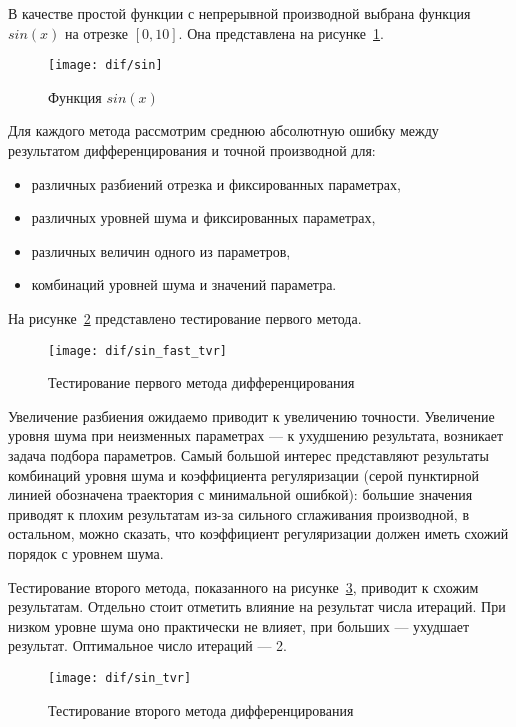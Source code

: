 В качестве простой функции с непрерывной производной выбрана функция $sin(x)$ на отрезке $[0, 10]$. Она представлена на рисунке~\ref{fig:dif:sin}.

\begin{figure}
\texttt{[image: dif/sin]}
\caption{Функция $sin(x)$}
\label{fig:dif:sin}
\end{figure}

Для каждого метода рассмотрим среднюю абсолютную ошибку между результатом дифференцирования и точной производной для:
\begin{itemize}
\item различных разбиений отрезка и фиксированных параметрах,
\item различных уровней шума и фиксированных параметрах,
\item различных величин одного из параметров,
\item комбинаций уровней шума и значений параметра.
\end{itemize}

На рисунке~\ref{fig:dif:sin_fast_tvr} представлено тестирование первого метода.

\begin{figure}
\texttt{[image: dif/sin\_fast\_tvr]}
\caption{Тестирование первого метода дифференцирования}
\label{fig:dif:sin_fast_tvr}
\end{figure}

Увеличение разбиения ожидаемо приводит к увеличению точности. Увеличение уровня шума при неизменных параметрах --- к ухудшению результата, возникает задача подбора параметров. Самый большой интерес представляют результаты комбинаций уровня шума и коэффициента регуляризации (серой пунктирной линией обозначена траектория с минимальной ошибкой): большие значения приводят к плохим результатам из-за сильного сглаживания производной, в остальном, можно сказать, что коэффициент регуляризации должен иметь схожий порядок с уровнем шума.

Тестирование второго метода, показанного на рисунке~\ref{fig:dif:sin_tvr}, приводит к схожим результатам. Отдельно стоит отметить влияние на результат числа итераций. При низком уровне шума оно практически не влияет, при больших --- ухудшает результат. Оптимальное число итераций --- 2.

\begin{figure}
\texttt{[image: dif/sin\_tvr]}
\caption{Тестирование второго метода дифференцирования}
\label{fig:dif:sin_tvr}
\end{figure}

